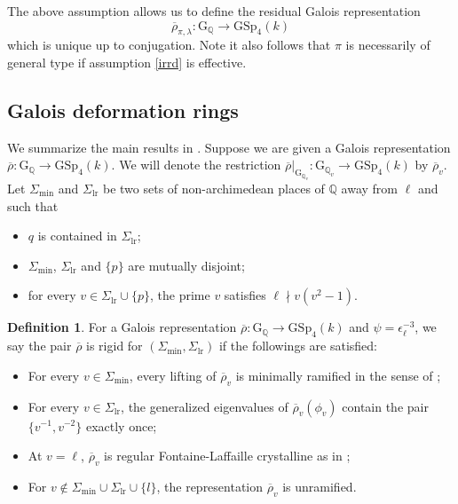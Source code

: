 \documentclass[10pt]{amsart}
\numberwithin{equation}{section}
\theoremstyle{definition}
\newtheorem{definition}[equation]{Definition}
\def\GSp{\mathrm{GSp}}
\def\min{\mathrm{min}}
\def\lr{\mathrm{lr}}
\def\QQ{\mathbb{Q}}
\def\rmG{\mathrm{G}}
\begin{document}
The above assumption allows us to define the residual Galois representation
\begin{equation}\label{residual}
\overline{\rho}_{\pi,\lambda}: \rmG_{\QQ}\rightarrow \GSp_{4}(k)
\end{equation}
which is unique up to conjugation. Note it also follows that $\pi$ is necessarily of general type if assumption \ref{irrd} is effective.


\subsection{Galois deformation rings} We summarize the main results in \cite{Wangd}. Suppose we are given a Galois representation $\overline{\rho}: \rmG_{\QQ}\rightarrow\GSp_{4}(k)$. We will denote the restriction $\overline{\rho}\vert_{\rmG_{\QQ_{v}}}: \rmG_{\QQ_{v}}\rightarrow\GSp_{4}(k)$ by $\overline{\rho}_{v}$.  Let $\Sigma_{\min}$ and $\Sigma_{\lr}$ be two sets of  non-archimedean places of $\QQ$ away from $\ell$ and such that
\begin{itemize}
\item $q$ is contained in $\Sigma_{\lr}$;
\item $\Sigma_{\min}$, $\Sigma_{\lr}$ and $\{p\}$ are mutually disjoint;
\item for every $v\in\Sigma_{\lr}\cup\{p\}$, the prime $v$ satisfies $\ell\nmid v(v^{2}-1)$.
\end{itemize}
\begin{definition}\label{rigid}
For a Galois representation $\overline{\rho}: \rmG_{\QQ}\rightarrow\GSp_{4}(k)$ and $\psi=\epsilon^{-3}_{\ell}$, we say the pair $\overline{\rho}$ is rigid for $(\Sigma_{\mathrm{min}}, \Sigma_{\mathrm{lr}})$ if the followings are satisfied:
\begin{itemize}
\item For every $v\in\Sigma_{\min}$, every lifting of $\overline{\rho}_{v}$ is minimally ramified in the sense of \cite[Definition 3.4]{Wangd};
\item For every $v\in\Sigma_{\lr}$, the generalized eigenvalues of $\overline{\rho}_{v}(\phi_{v})$ contain the pair $\{v^{-1}, v^{-2}\}$ exactly once;
\item At $v=\ell$, $\overline{\rho}_{v}$ is regular Fontaine-Laffaille crystalline as in \cite[Definition 3.10]{Wangd};
\item For $v\not\in\Sigma_{\min}\cup\Sigma_{\lr}\cup\{l\}$, the representation $\overline{\rho}_{v}$ is unramified.
\end{itemize}
\end{definition}
\end{document}
